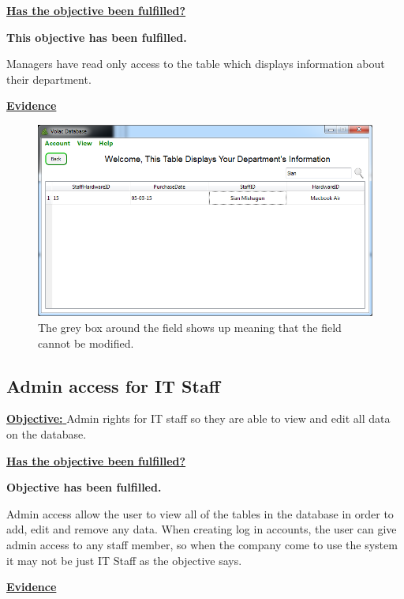 \underline{\textbf{Has the objective been fulfilled?}}

\textbf{This objective has been fulfilled.}

Managers have read only access to the table which displays information about their department.

\underline{\textbf{Evidence}}

\begin{figure}[H]
    \includegraphics[width=\textwidth]{./Evaluation/Images/readonlymanager.png}
    \caption{The grey box around the field shows up meaning that the field cannot be modified.} 
\end{figure}




\subsection{Admin access for IT Staff}\label{admin}

\underline{\textbf{Objective:} } Admin rights for IT staff so they are able to view and edit all data on the database.

\underline{\textbf{Has the objective been fulfilled?}}

\textbf{Objective has been fulfilled.}

Admin access allow the user to  view all of the tables in the database in order to add, edit and remove any data. When creating log in accounts, the user can give admin access to any staff member, so when the company come to use the system it may not be just IT Staff as the objective says.

\underline{\textbf{Evidence}}

